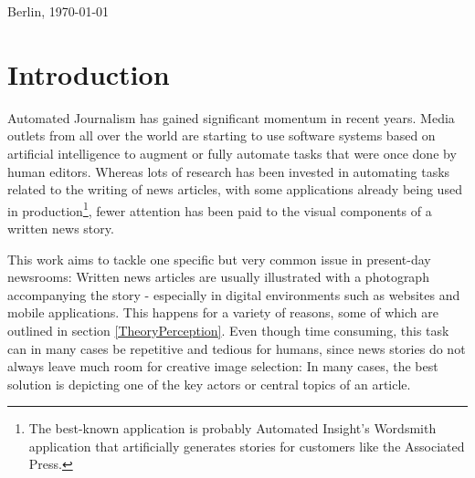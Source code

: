 \documentclass[11pt,a4paper,twoside]{article}
\begin{document}
\bigskip\noindent Berlin, \today

\vspace{4ex}\noindent\makebox[7cm]{\dotfill}


\cleardoublepage
\pagestyle{fancy}
\setcounter{page}{1}

\tableofcontents


\cleardoublepage

\setcounter{page}{1}
\fancyhead[LE,RO]{\rightmark}
\fancyhead[LO,RE]{\leftmark}
\fancyfoot[LE,RO]{\thepage}

\section{Introduction}

Automated Journalism has gained significant momentum in recent years. Media outlets from all over the world are starting to use software systems based on artificial intelligence to augment or fully automate tasks that were once done by human editors. Whereas lots of research has been invested in automating tasks related to the writing of news articles, with some applications already being used in production\footnote{The best-known application is probably Automated Insight's Wordsmith application that artificially generates stories for customers like the Associated Press.\cite{AssociatedPressAutomatedInsights}}, fewer attention has been paid to the visual components of a written news story. 

This work aims to tackle one specific but very common issue in present-day newsrooms: Written news articles are usually illustrated with a photograph accompanying the story - especially in digital environments such as websites and mobile applications. This happens for a variety of reasons, some of which are outlined in section \ref{TheoryPerception}. Even though time consuming, this task can in many cases be repetitive and tedious for humans, since news stories do not always leave much room for creative image selection: In many cases, the best solution is depicting one of the key actors or central topics of an article.
\end{document}
